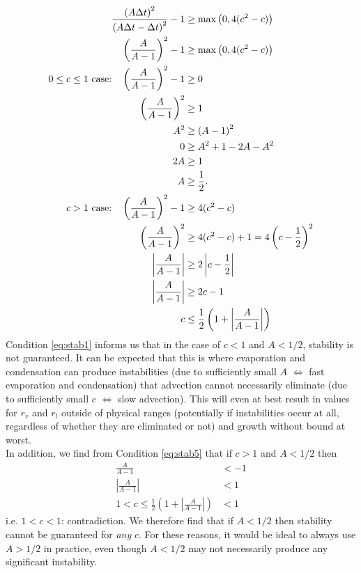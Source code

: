\documentclass[11pt]{article}
\begin{document}
\begin{align}
\frac{\left(A\Delta t\right)^2}{\left(A\Delta t-\Delta t\right)^2}-1 &\geq \max\left(0,4(c^2-c)\right) \nonumber\\
\left(\frac{A}{A-1}\right)^2 -1 &\geq \max\left(0,4(c^2-c)\right) \label{eq:two_cases} \\
\text{$0\leq c\leq 1$ case:\quad} \left(\frac{A}{A-1}\right)^2 -1 &\geq 0 \nonumber\\
\left(\frac{A}{A-1}\right)^2 &\geq 1 \nonumber\\
A^2 &\geq \left(A-1\right)^2 \nonumber\\
0 &\geq A^2 + 1 - 2A - A^2 \nonumber\\
2A &\geq 1 \nonumber\\
A &\geq \frac{1}{2}.		\label{eq:stab1} \\
\text{$c>1$ case:\quad} \left(\frac{A}{A-1}\right)^2 -1 &\geq 4(c^2-c)		\label{eq:stab4} \\
\left(\frac{A}{A-1}\right)^2 &\geq 4(c^2-c)+1 = 4\left(c-\frac{1}{2}\right)^2 \nonumber \\
\left|\frac{A}{A-1}\right| &\geq 2\left|c-\frac{1}{2}\right| \nonumber \\
\left|\frac{A}{A-1}\right| &\geq 2c-1 \nonumber \\
c &\leq \frac{1}{2}\left(1 + \left|\frac{A}{A-1}\right|\right) 	\label{eq:stab5}
\end{align}
Condition \ref{eq:stab1} informs us that in the case of $c<1$ and $A<1/2$, stability is not guaranteed. It can be expected that this is where evaporation and condensation can produce instabilities (due to sufficiently small $A$ $\Leftrightarrow$ fast evaporation and condensation) that advection cannot necessarily eliminate (due to sufficiently small $c$ $\Leftrightarrow$ slow advection). This will even at best result in values for $r_v$ and $r_l$ outside of physical ranges (potentially if instabilities occur at all, regardless of whether they are eliminated or not) and growth without bound at worst. \\
In addition, we find from Condition \ref{eq:stab5} that if $c>1$ and $A<1/2$ then
\begin{align}
\frac{A}{A-1} &< -1 \nonumber\\
\left|\frac{A}{A-1}\right| &< 1 \nonumber\\
1 < c \leq \frac{1}{2}\left(1 + \left|\frac{A}{A-1}\right|\right) &< 1	\label{eq:contradiction}
\end{align}
i.e. $1<c<1$: contradiction. We therefore find that if $A<1/2$ then stability cannot be guaranteed for \emph{any} $c$. For these reasons, it would be ideal to always use $A>1/2$ in practice, even though $A<1/2$ may not necessarily produce any significant instability. \\
\end{document}
